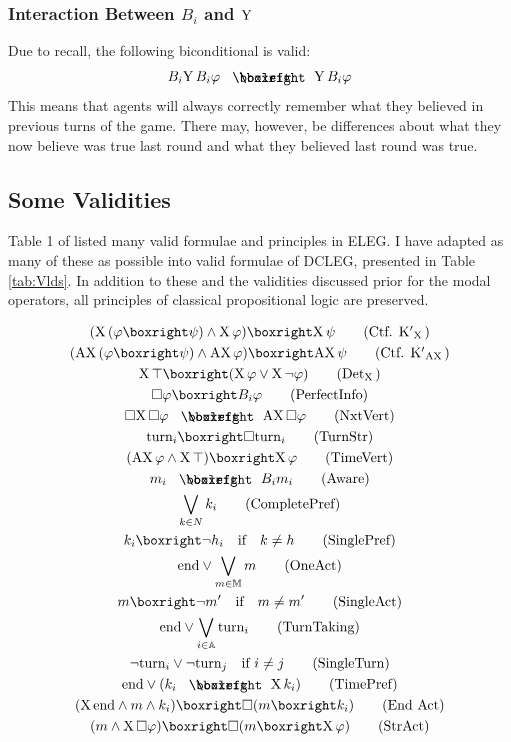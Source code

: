 \documentclass{article}
\let\cite\textcite
\begin{document}
\subsubsection{Interaction Between $B_i$ and $\text{Y}\,$}
Due to recall, the following biconditional is valid:
\begin{equation*}
    B_i\Y B_i\varphi\boxiff\Y B_i\varphi
\end{equation*}
This means that agents will always correctly remember what they believed in previous turns of the game. There may, however, be differences about what they now believe was true last round and what they believed last round was true.
\subsection{Some Validities}
Table 1 of \cite{LoMo11} listed many valid formulae and principles in ELEG. I have adapted as many of these as possible into valid formulae of DCLEG, presented in Table \ref{tab:Vlds}. In addition to these and the validities discussed prior for the modal operators, all principles of classical propositional logic are preserved. 

\begin{table}
    \centering
    \begin{gather}
    (\X(\varphi\boxright\psi)\land\X\varphi)\boxright\X\psi\tag{Ctf. K$'$$_{\X}$}\\
    (\AX(\varphi\boxright\psi)\land\AX\varphi)\boxright\AX\psi\tag{Ctf. K$'$$_{\AX}$}\\
    \X\top\boxright(\X\varphi\lor\X\lnot\varphi)\tag{Det$_{\X}$}\\
    \square\varphi\boxright B_i\varphi\tag{PerfectInfo}\\
    \square\X\square\varphi\boxiff\AX\square\varphi\tag{NxtVert}\\
    \turn_i\boxright\square\turn_i\tag{TurnStr}\\
    (\AX\varphi\land\X\top)\boxright\X\varphi\tag{TimeVert}\\
    m_i\boxiff B_im_i\tag{Aware}\\
    \bigvee_{k\in N}k_i\tag{CompletePref}\\
    k_i\boxright\lnot h_i\text{\quad if\quad} k\ne h\tag{SinglePref}\\
    \fin\lor\bigvee_{m\in\Act}m\tag{OneAct}\\
    m\boxright\lnot m'\text{\quad if\quad} m\ne m'\tag{SingleAct}\\
    \fin\lor\bigvee_{i\in\Agt}\turn_i\tag{TurnTaking}\\
    \lnot\turn_i\lor\lnot\turn_j\text{\quad if }i\ne j\tag{SingleTurn}\\
    \fin\lor(k_i\boxiff \X k_i)\tag{TimePref}\\
    (\X\fin\land m\land k_i)\boxright\square(m\boxright k_i)\tag{End Act}\\
    (m\land\X\square\varphi)\boxright\square(m\boxright\X\varphi)\tag{StrAct}
\end{gather}
    \caption{Some Validities of DCLEG}
    \label{tab:Vlds}
\end{table}
\end{document}
